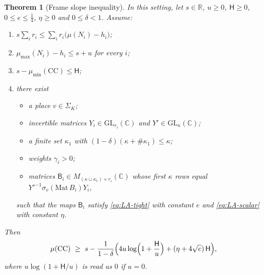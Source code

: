 \documentclass[10pt]{amsart}
\newtheorem{theorem}{Theorem}[section]
\theoremstyle{definition}
\theoremstyle{remark}
\newcommand{\C}{\mathbb C}
\newcommand{\R}{\mathbb R}
\begin{document}
\begin{theorem}[Frame slope inequality]\label{thm:frameF}
In this setting, let $s\in\R$, $u\ge0$, $\mathsf H\ge0$, $0\le e\le\frac14$, $\eta\ge0$ and $0\le\delta<1$. Assume:
\begin{enumerate}
\item[(F1)] $s\sum_ir_i\le\sum_ir_i\bigl(\mu(N_i)-h_i\bigr)$;
\item[(F2)] $\mu_{\max}(N_i)-h_i\le s+u$ for every $i$;
\item[(F3)] $s-\mu_{\min}(\mathrm{CC})\le\mathsf H$;
\item[(F4)] there exist
  \begin{itemize}
  \item a place $v\in\Sigma_K$;
  \item invertible matrices $Y_i\in\mathrm{GL}_{r_i}(\C)$ and $Y'\in\mathrm{GL}_\kappa(\C)$;
  \item a finite set $\kappa_1$ with $(1-\delta)(\kappa+\#\kappa_1)\le\kappa$;
  \item weights $\gamma_i>0$;
  \item matrices $\mathsf B_i\in M_{(\kappa\sqcup\kappa_1)\times r_i}(\C)$ whose first $\kappa$ rows equal $Y'^{-1}\sigma_v(\mathrm{Mat}\,B_i)Y_i$,
  \end{itemize}
  such that the maps $\mathsf B_i$ satisfy \eqref{eq:LA-tight} with constant $e$ and \eqref{eq:LA-scalar} with constant $\eta$.
\end{enumerate}
Then
\[
\mu(\mathrm{CC})\ \ge\ s-\frac{1}{1-\delta}\Bigl(4u\log\Bigl(1+\frac{\mathsf H}{u}\Bigr)+(\eta+4\sqrt e)\,\mathsf H\Bigr),
\]
where $u\log(1+\mathsf H/u)$ is read as $0$ if $u=0$.
\end{theorem}
\end{document}
